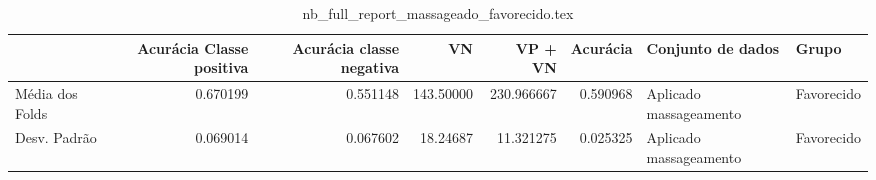 \begin{table}
\centering
\caption{nb_full_report_massageado_favorecido.tex}
\label{nb_full_report_massageado_favorecido.tex}
\begin{tabular}{lrrrrrll}
\toprule
{} &  Acurácia Classe positiva &  Acurácia classe negativa &        VN  &    VP + VN  &  Acurácia &       Conjunto de dados &       Grupo \\
\midrule
Média dos Folds &                  0.670199 &                  0.551148 &  143.50000 &  230.966667 &  0.590968 &  Aplicado massageamento &  Favorecido \\
Desv. Padrão    &                  0.069014 &                  0.067602 &   18.24687 &   11.321275 &  0.025325 &  Aplicado massageamento &  Favorecido \\
\bottomrule
\end{tabular}
\end{table}
